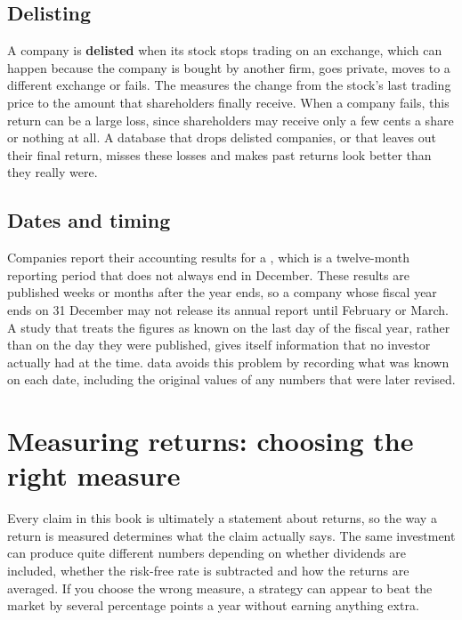 \subsection{Delisting}

A company is \textbf{delisted} when its stock stops trading on an exchange, which can happen because the company is bought by another firm, goes private, moves to a different exchange or fails. The  measures the change from the stock's last trading price to the amount that shareholders finally receive. When a company fails, this return can be a large loss, since shareholders may receive only a few cents a share or nothing at all. A database that drops delisted companies, or that leaves out their final return, misses these losses and makes past returns look better than they really were.


\subsection{Dates and timing}

Companies report their accounting results for a , which is a twelve-month reporting period that does not always end in December. These results are published weeks or months after the year ends, so a company whose fiscal year ends on 31 December may not release its annual report until February or March. A study that treats the figures as known on the last day of the fiscal year, rather than on the day they were published, gives itself information that no investor actually had at the time.  data avoids this problem by recording what was known on each date, including the original values of any numbers that were later revised.

\section{Measuring returns: choosing the right measure}
\label{sec:02-returns}

Every claim in this book is ultimately a statement about returns, so the way a return is measured determines what the claim actually says. The same investment can produce quite different numbers depending on whether dividends are included, whether the risk-free rate is subtracted and how the returns are averaged. If you choose the wrong measure, a strategy can appear to beat the market by several percentage points a year without earning anything extra.

